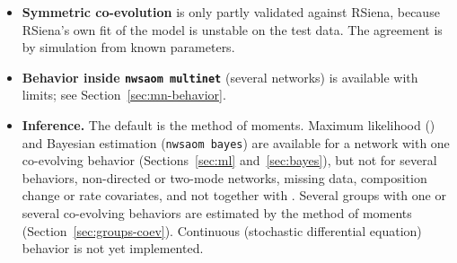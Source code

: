 \begin{itemize}
\item \textbf{Symmetric co-evolution} is only partly validated against RSiena, because RSiena's own fit of the model is unstable on the test data. The agreement is by simulation from known parameters.
\item \textbf{Behavior inside \texttt{nwsaom multinet}} (several networks) is available with limits; see Section~\ref{sec:mn-behavior}.
\item \textbf{Inference.} The default is the method of moments. Maximum likelihood () and Bayesian estimation (\texttt{nwsaom bayes}) are available for a network with one co-evolving behavior (Sections~\ref{sec:ml} and~\ref{sec:bayes}), but not for several behaviors, non-directed or two-mode networks, missing data, composition change or rate covariates, and not together with . Several groups with one or several co-evolving behaviors are estimated by the method of moments (Section~\ref{sec:groups-coev}). Continuous (stochastic differential equation) behavior is not yet implemented.
\end{itemize}
\endgroup
